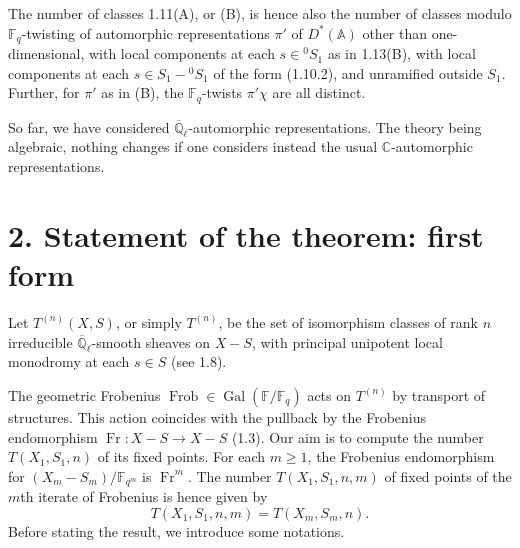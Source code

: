 \documentclass[10pt]{article}
\newcommand{\Fq}{\mathbb F_q}
\newcommand{\Fqm}{\mathbb F_{q^m}}
\newcommand{\Fb}{\mathbb F}
\newcommand{\Ql}{\overline{\mathbb Q}_{\ell}}
\newcommand{\C}{\mathbb C}
\newcommand{\Adele}{\mathbb A}
\newcommand{\Gal}{\operatorname{Gal}}
\newcommand{\Fr}{\operatorname{Fr}}
\newcommand{\Frob}{\operatorname{Frob}}
\theoremstyle{deligne}
\newcommand{\heading}[1]{\vspace{0.7em}\noindent{\bfseries #1}\quad}
\begin{document}
The number of classes 1.11(A), or (B), is hence also the number of classes modulo $\Fq$-twisting of automorphic representations $\pi'$ of $D^*(\Adele)$ other than one-dimensional, with local components at each $s\in{}^0S_1$ as in 1.13(B), with local components at each $s\in S_1-{}^0S_1$ of the form (1.10.2), and unramified outside $S_1$. Further, for $\pi'$ as in (B), the $\Fq$-twists $\pi'\chi$ are all distinct.

So far, we have considered $\Ql$-automorphic representations. The theory being algebraic, nothing changes if one considers instead the usual $\C$-automorphic representations.

\section*{2. Statement of the theorem: first form}

\heading{2.1.} Let $T^{(n)}(X,S)$, or simply $T^{(n)}$, be the set of isomorphism classes of rank $n$ irreducible $\Ql$-smooth sheaves on $X-S$, with principal unipotent local monodromy at each $s\in S$ (see 1.8).

The geometric Frobenius $\Frob\in\Gal(\Fb/\Fq)$ acts on $T^{(n)}$ by transport of structures. This action coincides with the pullback by the Frobenius endomorphism $\Fr:X-S\to X-S$ (1.3). Our aim is to compute the number $T(X_1,S_1,n)$ of its fixed points. For each $m\ge1$, the Frobenius endomorphism for $(X_m-S_m)/\Fqm$ is $\Fr^m$. The number $T(X_1,S_1,n,m)$ of fixed points of the $m$th iterate of Frobenius is hence given by
\begin{equation}\tag{2.1.1}
T(X_1,S_1,n,m)=T(X_m,S_m,n).
\end{equation}
Before stating the result, we introduce some notations.
\end{document}
